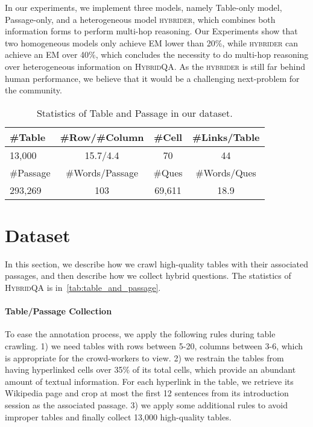 \documentclass[11pt,a4paper]{article}
\newcommand{\dataset}{\textsc{HybridQA}\xspace}
\newcommand{\model}{\textsc{hybrider}\xspace}
\begin{document}
In our experiments, we implement three models, namely Table-only model, Passage-only, and a heterogeneous model \model, which combines both information forms to perform multi-hop reasoning. Our Experiments show that two homogeneous models only achieve EM lower than 20\%, while \model can achieve an EM over 40\%, which concludes the necessity to do multi-hop reasoning over heterogeneous information on \dataset. As the \model is still far behind human performance, we believe that it would be a challenging next-problem for the community.


\begin{table}[!t]
\small
\centering
\begin{tabular}{lccc}
\hline
\#Table & \#Row/\#Column & \#Cell &  \#Links/Table \\ 
\hline
13,000 & 15.7/4.4 & 70 & 44 \\
\hline
\#Passage & \#Words/Passage & \#Ques & \#Words/Ques \\
\hline
293,269 & 103 &  69,611 & 18.9 \\
\hline
\end{tabular}
\caption{Statistics of Table and Passage in our dataset.}
\label{tab:table_and_passage}
\vspace{-2ex}
\end{table}

\section{Dataset}
In this section, we describe how we crawl high-quality tables with their associated passages, and then describe how we collect hybrid questions. The statistics of \dataset is in~\autoref{tab:table_and_passage}.

\paragraph{Table/Passage Collection}
To ease the annotation process, we apply the following rules during table crawling. 1) we need tables with rows between 5-20, columns between 3-6, which is appropriate for the crowd-workers to view. 2) we restrain the tables from having hyperlinked cells over 35\% of its total cells, which provide an abundant amount of textual information. For each hyperlink in the table, we retrieve its Wikipedia page and crop at most the first 12 sentences from its introduction session as the associated passage. 3) we apply some additional rules to avoid improper tables and finally collect 13,000 high-quality tables.  
\end{document}
